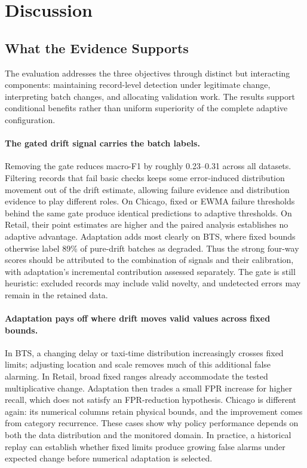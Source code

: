 \section{Discussion}
\label{sec:discussion}

\subsection{What the Evidence Supports}

The evaluation addresses the three objectives through distinct but interacting components: maintaining record-level detection under legitimate change, interpreting batch changes, and allocating validation work. The results support conditional benefits rather than uniform superiority of the complete adaptive configuration.

\paragraph{The gated drift signal carries the batch labels.} Removing the gate reduces macro-F1 by roughly 0.23--0.31 across all datasets. Filtering records that fail basic checks keeps some error-induced distribution movement out of the drift estimate, allowing failure evidence and distribution evidence to play different roles. On Chicago, fixed or EWMA failure thresholds behind the same gate produce identical predictions to adaptive thresholds. On Retail, their point estimates are higher and the paired analysis establishes no adaptive advantage. Adaptation adds most clearly on BTS, where fixed bounds otherwise label 89\% of pure-drift batches as degraded. Thus the strong four-way scores should be attributed to the combination of signals and their calibration, with adaptation's incremental contribution assessed separately. The gate is still heuristic: excluded records may include valid novelty, and undetected errors may remain in the retained data.

\paragraph{Adaptation pays off where drift moves valid values across fixed bounds.} In BTS, a changing delay or taxi-time distribution increasingly crosses fixed limits; adjusting location and scale removes much of this additional false alarming. In Retail, broad fixed ranges already accommodate the tested multiplicative change. Adaptation then trades a small FPR increase for higher recall, which does not satisfy an FPR-reduction hypothesis. Chicago is different again: its numerical columns retain physical bounds, and the improvement comes from category recurrence. These cases show why policy performance depends on both the data distribution and the monitored domain. In practice, a historical replay can establish whether fixed limits produce growing false alarms under expected change before numerical adaptation is selected.

